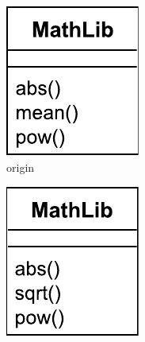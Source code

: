 \vspace{-10pt}
\begin{figure}[H]
    \centering    
    \hfill
    \begin{subfigure}[t]{0.2\linewidth}
        \centering
        \includegraphics[width=\linewidth]{OriginalClassDiagram}
        \caption{origin}
        \label{fig:origin}
    \end{subfigure}
    \hfill
    \begin{subfigure}[t]{0.2\linewidth}
        \centering
        \includegraphics[width=\linewidth]{LeftClassDiagram}

\end{subfigure}
\end{figure}
